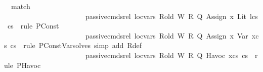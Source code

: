 \begin{isabellebody}
\ \ {\isacharparenleft}{\kern0pt}match\ \ \ \ \ \ \ \ \ \ \ \ \ \ \ \ \ \ \ \ \ \ \ \ \ \isanewline
\ \ \ \ \ \ \ \ \ \ \ \ \ \ \ \ \ \ \ \ \ \ \ {\isachardoublequoteopen}passive{\isacharunderscore}{\kern0pt}cmds{\isacharunderscore}{\kern0pt}rel\ {\isacharquery}{\kern0pt}loc{\isacharunderscore}{\kern0pt}vars\ {\isacharquery}{\kern0pt}R{\isacharunderscore}{\kern0pt}old\ {\isacharquery}{\kern0pt}W\ {\isacharquery}{\kern0pt}R\ {\isacharquery}{\kern0pt}Q\ {\isacharparenleft}{\kern0pt}{\isacharparenleft}{\kern0pt}Assign\ {\isacharquery}{\kern0pt}x{}\ {\isacharparenleft}{\kern0pt}Lit\ {\isacharquery}{\kern0pt}l{\isacharparenright}{\kern0pt}{\isacharparenright}{\kern0pt}{\isacharhash}{\kern0pt}{\isacharquery}{\kern0pt}cs{}{\isacharparenright}{\kern0pt}\ {\isacharquery}{\kern0pt}cs{}{\isachardoublequoteclose}\ {\isasymRightarrow}\ {\isacartoucheopen}rule\ PConst{\isacartoucheclose}\ {\isasymbar}\isanewline
\ \ \ \ \ \ \ \ \ \ \ \ \ \ \ \ \ \ \ \ \ \ \ {\isachardoublequoteopen}passive{\isacharunderscore}{\kern0pt}cmds{\isacharunderscore}{\kern0pt}rel\ {\isacharquery}{\kern0pt}loc{\isacharunderscore}{\kern0pt}vars\ {\isacharquery}{\kern0pt}R{\isacharunderscore}{\kern0pt}old\ {\isacharquery}{\kern0pt}W\ {\isacharquery}{\kern0pt}R\ {\isacharquery}{\kern0pt}Q\ {\isacharparenleft}{\kern0pt}{\isacharparenleft}{\kern0pt}Assign\ {\isacharquery}{\kern0pt}x{}\ {\isacharparenleft}{\kern0pt}Var\ {\isacharquery}{\kern0pt}x{}{\isacharprime}{\kern0pt}{\isacharparenright}{\kern0pt}{\isacharparenright}{\kern0pt}{\isacharhash}{\kern0pt}{\isacharquery}{\kern0pt}cs{}{\isacharparenright}{\kern0pt}\ {\isacharquery}{\kern0pt}cs{}{\isachardoublequoteclose}\ {\isasymRightarrow}\ {\isacartoucheopen}rule\ PConstVar{\isacharcomma}{\kern0pt}solves\ {\isasymopen}simp\ add{\isacharcolon}{\kern0pt}\ R{\isacharunderscore}{\kern0pt}def{\isasymclose}{\isacartoucheclose}\ {\isasymbar}\isanewline
\ \ \ \ \ \ \ \ \ \ \ \ \ \ \ \ \ \ \ \ \ \ \ {\isachardoublequoteopen}passive{\isacharunderscore}{\kern0pt}cmds{\isacharunderscore}{\kern0pt}rel\ {\isacharquery}{\kern0pt}loc{\isacharunderscore}{\kern0pt}vars\ {\isacharquery}{\kern0pt}R{\isacharunderscore}{\kern0pt}old\ {\isacharquery}{\kern0pt}W\ {\isacharquery}{\kern0pt}R\ {\isacharquery}{\kern0pt}Q\ {\isacharparenleft}{\kern0pt}{\isacharparenleft}{\kern0pt}Havoc\ {\isacharquery}{\kern0pt}x{}{\isacharparenright}{\kern0pt}{\isacharhash}{\kern0pt}{\isacharquery}{\kern0pt}cs{}{\isacharparenright}{\kern0pt}\ {\isacharquery}{\kern0pt}cs{}{\isachardoublequoteclose}\ {\isasymRightarrow}\ {\isacartoucheopen}rule\ PHavoc{\isacartoucheclose}\ {\isasymbar}\isanewline

\end{isabellebody}
